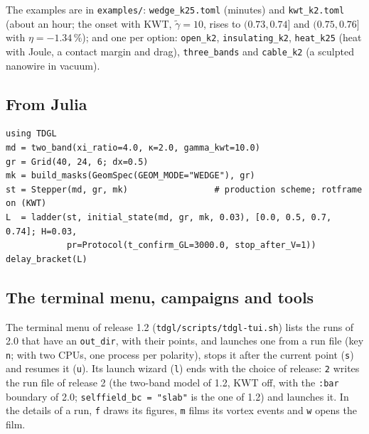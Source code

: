 \documentclass[11pt,a4paper]{article}
\newcommand{\code}[1]{\texttt{#1}}
\newcommand{\gt}{\tilde\gamma}
\begin{document}
The examples are in \code{examples/}:
\code{wedge\_k25.toml} (minutes) and \code{kwt\_k2.toml} (about an hour; the onset with KWT, $\gt = 10$, rises to
$(0.73, 0.74]$ and $(0.75, 0.76]$ with $\eta = -1.34\,\%$); and one per option: \code{open\_k2},
\code{insulating\_k2}, \code{heat\_k25} (heat with Joule, a contact margin and drag), \code{three\_bands} and
\code{cable\_k2} (a sculpted nanowire in vacuum).

\subsection{From Julia}

\begin{verbatim}
using TDGL
md = two_band(xi_ratio=4.0, κ=2.0, gamma_kwt=10.0)
gr = Grid(40, 24, 6; dx=0.5)
mk = build_masks(GeomSpec(GEOM_MODE="WEDGE"), gr)
st = Stepper(md, gr, mk)                 # production scheme; rotframe on (KWT)
L  = ladder(st, initial_state(md, gr, mk, 0.03), [0.0, 0.5, 0.7, 0.74]; H=0.03,
            pr=Protocol(t_confirm_GL=3000.0, stop_after_V=1))
delay_bracket(L)
\end{verbatim}

\subsection{The terminal menu, campaigns and tools}

The terminal menu of release 1.2 (\code{tdgl/scripts/tdgl-tui.sh}) lists the runs of 2.0 that have an
\code{out\_dir}, with their points, and launches one from a run file (key \code{n}; with two CPUs, one process per
polarity), stops it after the current point (\code{s}) and resumes it (\code{u}). Its launch wizard (\code{l}) ends with
the choice of release: \code{2} writes the run file of release 2 (the two-band model of 1.2, KWT off, with the \code{:bar}
boundary of 2.0; \code{selffield\_bc = "slab"} is the one of 1.2) and launches it. In the details of a run, \code{f} draws its
figures, \code{m} films its vortex events and \code{w} opens the film.
\end{document}
